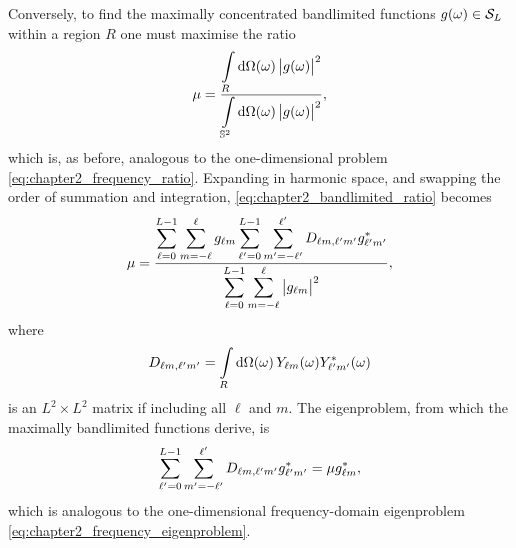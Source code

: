 Conversely, to find the maximally concentrated bandlimited functions \(\pixel{g} \in \spaceBandlimit{}\) within a region \(R\) one must maximise the ratio
%
\begin{equation}\label{eq:chapter2_bandlimited_ratio}
	\mu
	= \frac{\integrateRegion{\sphereVolume} \abs{\pixel{g}}^{2}}
	{\integrateSphere{\omega} \abs{\pixel{g}}^{2}},
\end{equation}
%
which is, as before, analogous to the one-dimensional problem \cref{eq:chapter2_frequency_ratio}.
Expanding in harmonic space, and swapping the order of summation and integration, \cref{eq:chapter2_bandlimited_ratio} becomes
%
\begin{equation}
	\mu
	= \frac{\displaystyle\sum\limits_{\ell=0}^{L-1} \sum\limits_{m=-\ell}^{\ell} \harmonic{g}
		\sum\limits_{\ell'=0}^{L-1} \sum\limits_{m'=-\ell'}^{\ell'} \Dmatrix \conj{\harmonic[']{g}}}
	{\displaystyle\sum\limits_{\ell=0}^{L-1} \sum\limits_{m=-\ell}^{\ell} \abs{\harmonic{g}}^{2}},
\end{equation}
%
where
%
\begin{equation}
	\Dmatrix
	= \integrateRegion{\sphereVolume} \pixel{\harmonic{Y}} \pixel{\conj{\harmonic[']{Y}}}
\end{equation}
%
is an \(L^{2} \times L^{2}\) matrix if including all \(\ell{}\) and \(m\).
The eigenproblem, from which the maximally bandlimited functions derive, is
%
\begin{equation}\label{eq:chapter2_harmonic_eigenproblem}
	\sum\limits_{\ell'=0}^{L-1} \sum\limits_{m'=-\ell'}^{\ell'} \Dmatrix \conj{\harmonic[']{g}}
	= \mu \conj{\harmonic{g}},
\end{equation}
%
which is analogous to the one-dimensional frequency-domain eigenproblem \cref{eq:chapter2_frequency_eigenproblem}.

